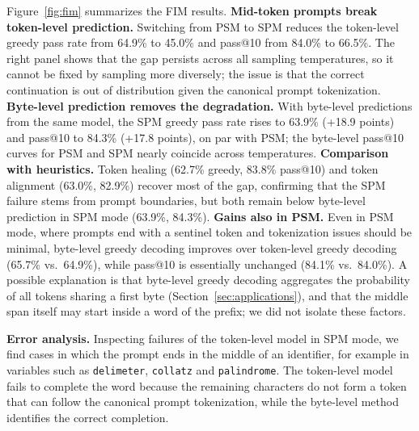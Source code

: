 \documentclass{article} %
\newcommand{\tok}[1]{\texttt{#1}}
\begin{document}
Figure~\ref{fig:fim} summarizes the FIM results. \textbf{Mid-token prompts break token-level prediction.} Switching from PSM to SPM reduces the token-level greedy pass rate from 64.9\% to 45.0\% and pass@10 from 84.0\% to 66.5\%. The right panel shows that the gap persists across all sampling temperatures, so it cannot be fixed by sampling more diversely; the issue is that the correct continuation is out of distribution given the canonical prompt tokenization. \textbf{Byte-level prediction removes the degradation.} With byte-level predictions from the same model, the SPM greedy pass rate rises to 63.9\% (+18.9 points) and pass@10 to 84.3\% (+17.8 points), on par with PSM; the byte-level pass@10 curves for PSM and SPM nearly coincide across temperatures. \textbf{Comparison with heuristics.} Token healing (62.7\% greedy, 83.8\% pass@10) and token alignment (63.0\%, 82.9\%) recover most of the gap, confirming that the SPM failure stems from prompt boundaries, but both remain below byte-level prediction in SPM mode (63.9\%, 84.3\%). \textbf{Gains also in PSM.} Even in PSM mode, where prompts end with a sentinel token and tokenization issues should be minimal, byte-level greedy decoding improves over token-level greedy decoding (65.7\% vs.\ 64.9\%), while pass@10 is essentially unchanged (84.1\% vs.\ 84.0\%). A possible explanation is that byte-level greedy decoding aggregates the probability of all tokens sharing a first byte (Section~\ref{sec:applications}), and that the middle span itself may start inside a word of the prefix; we did not isolate these factors.

\textbf{Error analysis.} Inspecting failures of the token-level model in SPM mode, we find cases in which the prompt ends in the middle of an identifier, for example in variables such as \tok{delimeter}, \tok{collatz} and \tok{palindrome}. The token-level model fails to complete the word because the remaining characters do not form a token that can follow the canonical prompt tokenization, while the byte-level method identifies the correct completion.
\end{document}
